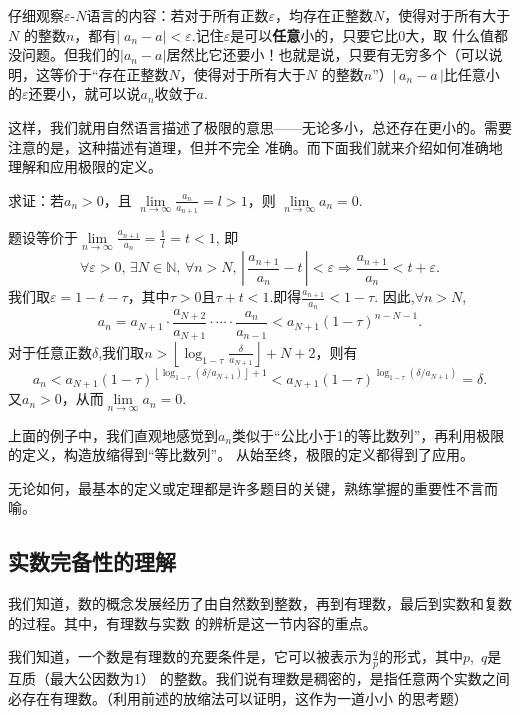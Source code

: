仔细观察$\varepsilon  \text{-}N$语言的内容：若对于所有正数$\varepsilon$，均存在正整数$N$，使得对于所有大于$N$
的整数$n$，都有$|\;\!a_n-a|<\varepsilon$.记住$\varepsilon$是可以\textbf{任意}小的，只要它比0大，取
什么值都没问题。但我们的$|a_n-a|$居然比它还要小！也就是说，只要有无穷多个（可以说明，这等价于“存在正整数$N$，使得对于所有大于$N$
的整数$n$”）$|\,a_n-a\,|$比任意小的$\varepsilon$还要小，就可以说$a_n$收敛于$a$.


这样，我们就用自然语言描述了极限的意思——无论多小，总还存在更小的。需要注意的是，这种描述有道理，但并不完全
准确。而下面我们就来介绍如何准确地理解和应用极限的定义。
\begin{example}
    求证：若$a_n>0$，且 $\lim\limits_{n \to \infty}\frac{a_n}{a_{n+1}}=l>1$，则 $\lim\limits_{n \to \infty}a_n=0$.
\end{example}
\begin{prove}
    题设等价于$\lim\limits_{n \to \infty}\frac{a_{n+1}}{a_n}=\frac{1}{l}=t<1$,
    即
    \[
        \forall \varepsilon>0,\,\exists N\in \mathbb{N},\,\forall n>N,\,\left|\, \frac{a_{n+1}}{a_n}-t\, \right| <\varepsilon
        \Rightarrow \frac{a_{n+1}}{a_n}<t+\varepsilon
        .\]
    我们取$\varepsilon=1-t-\tau $，其中$\tau >0$且$\tau +t<1$.即得$\frac{a_{n+1}}{a_n}<1-\tau $.
    因此,$\forall n>N,$
    \[
        a_n=a_{N+1}\cdot \frac{a_{N+2}}{a_{N+1}}\cdot \cdots \cdot\frac{a_n}{a_{n-1}}<a_{N+1}(1-\tau)^{n-N-1}
        .\]
    对于任意正数$\delta$,我们取$n>\left\lfloor\log_{1-\tau}\frac{\delta}{\scriptstyle{a}_{{N+1}}}  \right\rfloor+N+2$，则有
    \[
        a_n<a_{N+1}(1-\tau)^{\left\lfloor \log_{1-\tau}(\delta / a_{N+1}) \right\rfloor+1}
        <a_{N+1}(1-\tau)^{\log_{1-\tau}(\delta / a_{N+1})}=\delta
        .\]
    又$a_n>0$，从而$\lim\limits_{n \to \infty}a_n=0$.
\end{prove}
上面的例子中，我们直观地感觉到$a_n$类似于“公比小于1的等比数列”，再利用极限的定义，构造放缩得到“等比数列”。
从始至终，极限的定义都得到了应用。


无论如何，最基本的定义或定理都是许多题目的关键，熟练掌握的重要性不言而喻。

\subsection{实数完备性的理解}
我们知道，数的概念发展经历了由自然数到整数，再到有理数，最后到实数和复数的过程。其中，有理数与实数
的辨析是这一节内容的重点。


我们知道，一个数是有理数的充要条件是，它可以被表示为$\frac{q}{p}$的形式，其中$p$,~$q$是互质（最大公因数为1）
的整数。我们说有理数是稠密的，是指任意两个实数之间必存在有理数。（利用前述的放缩法可以证明，这作为一道小小
的思考题）



